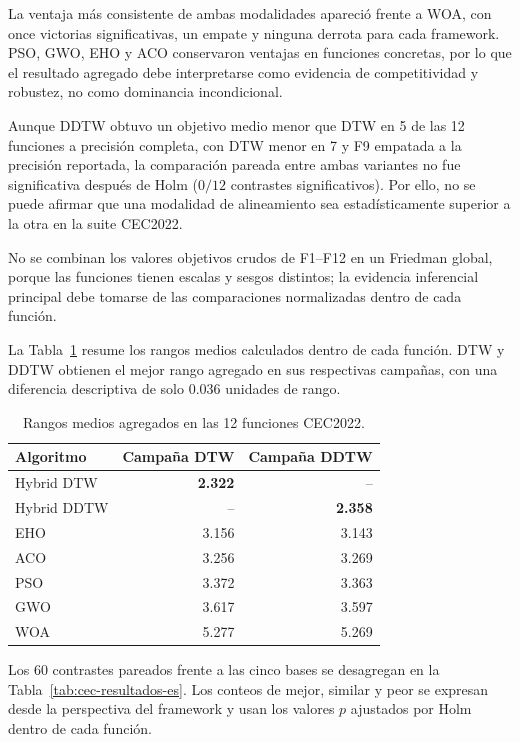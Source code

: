 La ventaja m\'as consistente de ambas modalidades apareci\'o frente a WOA, con
once victorias significativas, un empate y ninguna derrota para cada framework.
PSO, GWO, EHO y ACO conservaron ventajas en funciones concretas, por lo que el
resultado agregado debe interpretarse como evidencia de competitividad y
robustez, no como dominancia incondicional.

Aunque DDTW obtuvo un objetivo medio menor que DTW en 5 de las 12 funciones a
precisi\'on completa, con DTW menor en 7 y F9 empatada a la precisi\'on reportada,
la comparaci\'on pareada entre ambas variantes no fue significativa despu\'es de
Holm ($0/12$ contrastes significativos). Por ello, no se puede afirmar que una
modalidad de alineamiento sea estad\'isticamente superior a la otra en la suite
CEC2022.

No se combinan los valores objetivos crudos de F1--F12 en un Friedman global,
porque las funciones tienen escalas y sesgos distintos; la evidencia inferencial
principal debe tomarse de las comparaciones normalizadas dentro de cada funci\'on.

La Tabla~\ref{tab:cec-rangos-es} resume los rangos medios calculados dentro de
cada funci\'on. DTW y DDTW obtienen el mejor rango agregado en sus respectivas
campañas, con una diferencia descriptiva de solo 0.036 unidades de rango.

\begin{table}[htbp]
\centering
\caption{Rangos medios agregados en las 12 funciones CEC2022.}
\label{tab:cec-rangos-es}
\begin{tabular}{lrr}
\toprule
Algoritmo & Campaña DTW & Campaña DDTW \\
\midrule
Hybrid DTW & \textbf{2.322} & -- \\
Hybrid DDTW & -- & \textbf{2.358} \\
EHO & 3.156 & 3.143 \\
ACO & 3.256 & 3.269 \\
PSO & 3.372 & 3.363 \\
GWO & 3.617 & 3.597 \\
WOA & 5.277 & 5.269 \\
\bottomrule
\end{tabular}
\end{table}

Los 60 contrastes pareados frente a las cinco bases se desagregan en la
Tabla~\ref{tab:cec-resultados-es}. Los conteos de mejor, similar y peor se
expresan desde la perspectiva del framework y usan los valores $p$ ajustados
por Holm dentro de cada funci\'on.

